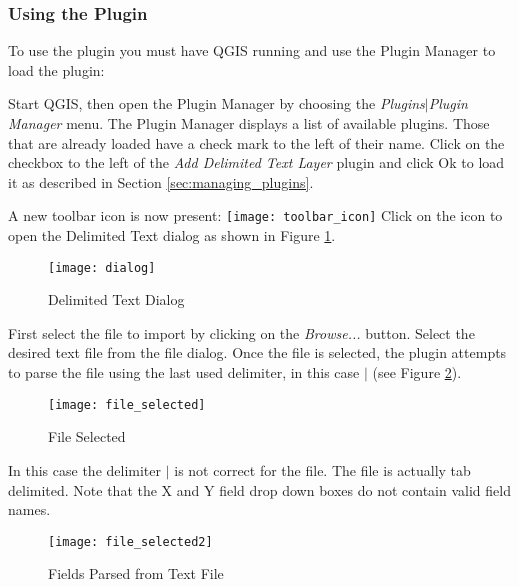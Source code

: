\subsubsection{Using the Plugin}
To use the plugin you must have QGIS running and use the Plugin Manager to
load the plugin:

Start QGIS, then open the Plugin Manager by choosing the {\em
Plugins\mbox{$|$}Plugin Manager} menu. The Plugin Manager displays a list of
available plugins. Those that are already loaded have a check mark to the
left of their name. Click on the checkbox to the left of the {\em Add
Delimited Text Layer} plugin and click Ok to load it as described in Section
\ref{sec:managing_plugins}.


A new toolbar icon is now present:
\texttt{[image: toolbar\_icon]}
Click on the icon to open the Delimited Text dialog as shown in Figure
\ref{fig:delim_text_plugin_dialog}.

\begin{figure}[ht]
   \begin{center}
   \caption{Delimited Text
Dialog}\label{fig:delim_text_plugin_dialog}\smallskip
\texttt{[image: dialog]}            
   \end{center}  
\end{figure}

First select the file to import by clicking on the \textit{Browse...} button.
Select the desired text file from the file dialog.
Once the file is selected, the plugin attempts to parse the file using the
last used delimiter, in this case \mbox{$|$} (see Figure
\ref{fig:delim_text_file_selected}).

\begin{figure}[ht]
   \begin{center}
   \caption{File Selected}\label{fig:delim_text_file_selected}\smallskip
\texttt{[image: file\_selected]}   
   \end{center}  
\end{figure}
  
In this case the delimiter \mbox{$|$} is not correct for the file. The file is
actually tab delimited. Note that the X and Y field drop down boxes do not
contain valid field names.

\begin{figure}[ht]
   \begin{center}
   \caption{Fields Parsed from Text
File}\label{fig:delim_text_file_selected2}\smallskip  
\texttt{[image: file\_selected2]}
   \end{center}  
\end{figure}

